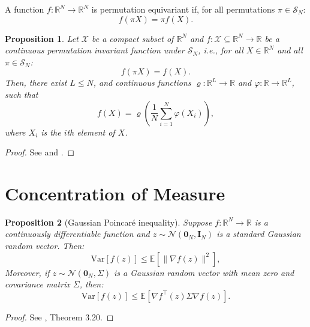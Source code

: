 \documentclass[12pt]{article}
\newtheorem{proposition}{Proposition}
\newcommand{\expec}[2][]{\ensuremath{\mathbb{E}_{{#1}}\left[ {#2} \right]}}
\begin{document}
\begin{definition} A function $f:\mathbb{R}^N\rightarrow \mathbb{R}^N$ is permutation equivariant if, for all permutations $\pi \in \mathcal{S}_N$:
\begin{equation*}
f(\pi X) = \pi f(X).
\end{equation*}
\end{definition}

\begin{proposition}
Let $\mathcal{X}$ be a compact subset of $\mathbb{R}^{N}$ and $f:\mathcal{X}\subseteq\mathbb{R}^{N} \rightarrow \mathbb{R}$ be a continuous permutation invariant function under $\mathcal{S}_N$, i.e., for all $X \in \mathbb{R}^{N}$ and all $\pi \in \mathcal{S}_N$:
\begin{equation*}
f(\pi X) = f(X).
\end{equation*}
Then, there exist $L\leq N$, and continuous functions $\varrho: \mathbb{R}^{L}\rightarrow \mathbb{R}$ and $\varphi : \mathbb{R} \rightarrow \mathbb{R}^L$, such that
\begin{equation*}
f\left(X\right) = \varrho \left(\frac{1}{N}\sum_{i=1}^N\varphi(X_i)\right),
\end{equation*}
where $X_i$ is the $i$th element of $X$.
\end{proposition}
\begin{proof}
See \citet{wagstaff2019limitations} and \citet{zaheer2017deep}.
\end{proof}
	
\section{Concentration of Measure}\label{sec:concentration-measure-defs}

\begin{proposition}[Gaussian Poincar\'e inequality]\label{prop:Gaussian-Poincare-ineq}Suppose $f:\mathbb{R}^N\rightarrow \mathbb{R}$ is a continuously differentiable function and $z\sim \mathcal{N}(\mathbf{0}_N,\mathbf{I}_N)$ is a standard Gaussian random vector. Then: 
\begin{equation*}
\mathrm{Var}[f(z)] \leq \expec{\|\nabla f(z)\|^2},
\end{equation*}
Moreover, if $z \sim \mathcal{N}(\mathbf{0}_N,\Sigma)$ is a Gaussian random vector with mean zero and covariance matrix $\Sigma$, then:
\begin{equation*}
\mathrm{Var}[f(z)] \leq \expec{\nabla f^\top(z) \Sigma  \nabla f(z)}.
\end{equation*}
\end{proposition}
\begin{proof}
See \citet{boucheron2013concentration}, Theorem 3.20.
\end{proof}
\end{document}
